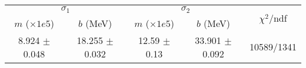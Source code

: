 \begin{tabular}{cc|cc||c}
\multicolumn{2}{c|}{$\sigma_1$} & \multicolumn{2}{|c}{$\sigma_2$} & \multirow{2}{*}{$\chi^2/$ndf} \\
$m$ ($\times1e5$) & $b$ (MeV) & $m$ ($\times1e5$) & $b$ (MeV) & \\
\hline
8.924 $\pm$ 0.048 & 18.255 $\pm$ 0.032 & 12.59 $\pm$ 0.13 & 33.901 $\pm$ 0.092 & 10589/1341\\
\end{tabular}
